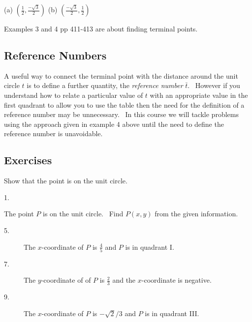 (a) $\left (\frac{1}{2} ,\frac{ -\sqrt{3}}{2}\right )$ (b) $\left (\frac{ -\sqrt{3}}{2} ,\frac{1}{2}\right )$ 

Examples 3 and 4 pp 411-413 are about finding
terminal points. 

\subsection{Reference Numbers}
A useful way to connect the terminal point with the distance around the unit circle $t$ is to define a further quantity, the \emph{reference number} $\bar{t}$. \ However if you understand how to relate a particular value of $t$ with an appropriate value in the first quadrant to allow you to use the table then the need for the definition of a reference
number may be unnecessary. \ In this course we will tackle problems using the approach given in example 4 above
until the need to define the reference number is unavoidable. 

\subsection{Exercises}
Show that the point is on the unit circle. 


\begin{description}
\item [1.]   
\columnsep =30pt
\end{description}

The point $P$ is on the unit circle. \ Find $P (x ,y)$ from the given information. 


\begin{description}
\item [5.] The $x$-coordinate of $P$ is $\frac{4}{5}$ and $P$ is in quadrant I. 

\item [7.] The
$y$-coordinate of of $P$ is $\frac{2}{3}$ and the $x$-coordinate is negative. 

\item [9.]
The $x$-coordinate of $P$ is $ -\sqrt{2}/3$ and $P$ is in quadrant III. \end{description}

